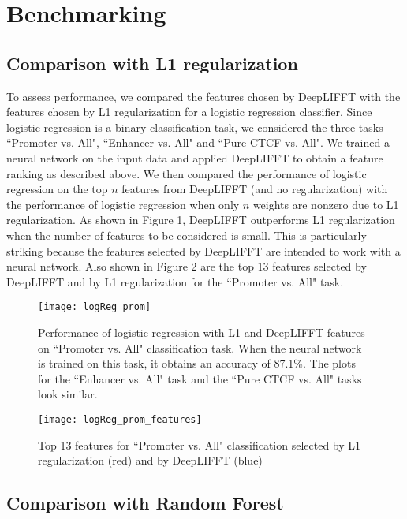 \documentclass{article}
\begin{document}
\section{Benchmarking}

\subsection{Comparison with L1 regularization}

To assess performance, we compared the features chosen by DeepLIFFT with the features chosen by L1 regularization for a logistic regression classifier. Since logistic regression is a binary classification task, we considered the three tasks ``Promoter vs. All", ``Enhancer vs. All" and ``Pure CTCF vs. All". We trained a neural network on the input data and applied DeepLIFFT to obtain a feature ranking as described above. We then compared the performance of logistic regression on the top $n$ features from DeepLIFFT (and no regularization) with the performance of logistic regression when only $n$ weights are nonzero due to L1 regularization. As shown in Figure 1, DeepLIFFT outperforms L1 regularization when the number of features to be considered is small. This is particularly striking because the features selected by DeepLIFFT are intended to work with a neural network. Also shown in Figure 2 are the top 13 features selected by DeepLIFFT and by L1 regularization for the ``Promoter vs. All" task.

\begin{figure}[!ht]
\centerline{\texttt{[image: logReg\_prom]}}
\caption{Performance of logistic regression with L1 and DeepLIFFT features on ``Promoter vs. All" classification task. When the neural network is trained on this task, it obtains an accuracy of 87.1\%. The plots for the ``Enhancer vs. All" task and the ``Pure CTCF vs. All" tasks look similar.}
\label{logReg_ctcf}
\end{figure} 

\begin{figure}[!ht]
\centerline{\texttt{[image: logReg\_prom\_features]}}
\label{logReg_prom_features}
\caption{Top 13 features for ``Promoter vs. All" classification selected by L1 regularization (red) and by DeepLIFFT (blue)}
\end{figure} 


\subsection{Comparison with Random Forest}
\end{document}
